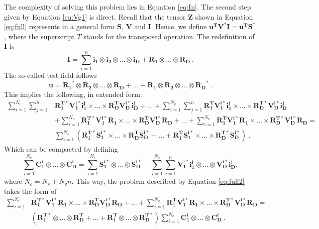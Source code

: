 The complexity of solving this problem lies in Equation \ref{eq:In}. The second step given by Equation \ref{eq:Vg1} is direct. Recall that the tensor $\bm{Z}$ shown in Equation \ref{eq:full} represents in a general form $\bm{S}$, $\bm{V}$ and $\bm{I}$. Hence, we define $\bm{u^T}\bm{V^*}\bm{I} = \bm{u^T}\bm{S^*}$, where the superscript $T$ stands for the transposed operation. The redefinition of $\bm{I}$ is
\begin{equation}
	\bm{I}=\sum_{i=1}^{n}\bm{i_1}\otimes \bm{i_2} \otimes ... \otimes \bm{i_D} + \bm{R_1}\otimes ... \otimes \bm{R_D} \ .
\label{eq:decomp}
\end{equation}
The so-called test field follows 
\begin{equation}
\bm{u} = \bm{R_1}^*\otimes \bm{R_2} \otimes ... \otimes \bm{R_D} + ... + \bm{R_1}\otimes \bm{R_2} \otimes ... \otimes \bm{R_D}^* \ .
\label{eq:decomp2}
\end{equation}
This implies the following, in extended form:
\begin{equation}
	\begin{split}
		\sum_{i=1}^{N_v}\sum_{j=1}^{n} & \bm{R_1^{T*} V_1^{i*} i_{1}^{j}} \times ... \times \bm{R_D^{T}V_D^{i*}i_D^j }  + ... + \sum_{i=1}^{N_v}\sum_{j=1}^{n}\bm{R_1^{T} V_1^{i*} i_{1}^{j}} \times ... \times  \bm{R_D^{T*}V_D^{i*}i_D^j } \\
					       & + \sum_{i=1}^{N_v}\bm{R_1^{T*}V_1^{i*}R_1} \times ... \times \bm{R_D^{T}V_D^{i*} R_D } + ... + \sum_{i=1}^{N_v}\bm{R_1^{T}V_1^{i*}R_1} \times ... \times \bm{R_D^{T*}V_D^{i*} R_D } = \\
					       & \sum_{i=1}^{N_s}\left(\bm{R_1^{T*}S_1^{i*}}\times ... \times \bm{R_D^T S_D^{i*}} + ... + \bm{R_1^T S_1^{i*}} \times ... \times \bm{R_D^{T*}S_D^{i*}}\right) \ . 
		\end{split}
\label{eq:full2}
\end{equation}
Which can be compacted by defining 
\begin{equation}
	\sum_{i=1}^{N_c}\bm{C_1^i}\otimes ... \otimes \bm{C_D^i} = \sum_{i=1}^{N_s}\bm{S_1^{i*}}\otimes ... \otimes \bm{S_D^{i*}} - \sum_{i=1}^{N_v}\sum_{j=1}^n \bm{V_1^{i*}i_1^{j}}\otimes ... \otimes \bm{V_D^{i*}i_D^{j}} ,
\label{eq:full3}
\end{equation}
where $N_c=N_s + N_vn$. This way, the problem described by Equation \ref{eq:full2} takes the form of 
\begin{equation}
	\begin{split}
		\sum_{i=1}^{N_v}& \bm{R_1^{T*}V_1^{i*}R_1} \times ... \times \bm{R_D^{T}V_D^{i*} R_D } + ... + \sum_{i=1}^{N_v}\bm{R_1^{T}V_1^{i*}R_1} \times ... \times \bm{R_D^{T*}V_D^{i*} R_D } = \\
				& \left(\bm{R_1^{T*}}\otimes ... \otimes \bm{R_D^{T}} + ... + \bm{R_1^T}\otimes ... \otimes \bm{R_D^{T*}}  \right)	\sum_{i=1}^{N_c}\bm{C_1^i}\otimes ... \otimes \bm{C_D^i} \ .
	\end{split}
\label{eq:full4}
\end{equation}
